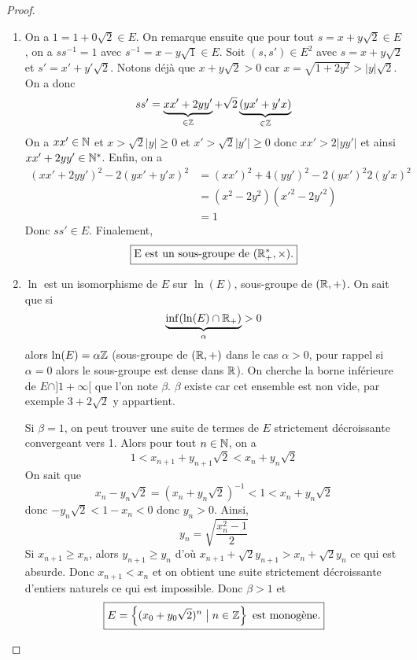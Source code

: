 \begin{proof}
	\phantom{}
	\begin{enumerate}
		\item On a $1=1+0\sqrt{2}\in E$. On remarque ensuite que pour tout $s=x+y\sqrt{2}\in E$, on a $ss^{-1}=1$ avec $s^{-1}=x-y\sqrt{1}\in E$. Soit $(s,s')\in E^{2}$ avec $s=x+y\sqrt{2}$ et $s'=x'+y'\sqrt{2}$. Notons déjà que $x+y\sqrt{2}>0$ car $x=\sqrt{1+2y^{2}}>\vert y\vert\sqrt{2}$.
		On a donc
		\begin{equation}
			ss'=\underbrace{xx'+2yy'}_{\in\mathbb{Z}}+\sqrt{2}\underbrace{(yx'+y'x)}_{\in\mathbb{Z}}
		\end{equation}
		On a $xx'\in\mathbb{N}$ et $x>\sqrt{2}\vert y\vert\geqslant0$ et $x'>\sqrt{2}\vert y'\vert\geqslant0$ donc $xx'>2\vert yy'\vert$ et ainsi $xx'+2yy'\in\mathbb{N}^{*}$. Enfin, on a 
		\begin{align}
			(xx'+2yy')^{2}-2(yx'+y'x)^{2}
			&=(xx')^{2}+4(yy')^{2}-2(yx')^{2}2(y'x)^{2}\\
			&=(x^{2}-2y^{2})(x'^{2}-2y'^{2})\\
			&=1
		\end{align}
		Donc $ss'\in E$. Finalement, 
		\begin{equation}
			\boxed{\text{E est un sous-groupe de }(\mathbb{R}_{+}^{*},\times).}
		\end{equation}

		\item $\ln$ est un isomorphisme de $E$ sur $\ln(E)$, sous-groupe de $(\mathbb{R},+)$. On sait que si 
		\begin{equation}
			\underbrace{\inf(\ln(E)\cap\mathbb{R}_{+})}_{\alpha}>0
		\end{equation}
		alors $\ln(E)=\alpha\mathbb{Z}$ (sous-groupe de $(\mathbb{R},+)$ dans le cas $\alpha>0$, pour rappel si $\alpha=0$ alors le sous-groupe est dense dans $\mathbb{R}$). On cherche la borne inférieure de $E\cap]1+\infty[$ que l'on note $\beta$. $\beta$ existe car cet ensemble est non vide, par exemple $3+2\sqrt{2}$ y appartient.
		
		Si $\beta=1$, on peut trouver une suite de termes de $E$ strictement décroissante convergeant vers 1. Alors pour tout $n\in\mathbb{N}$, on a 
		\begin{equation}
			1<x_{n+1}+y_{n+1}\sqrt{2}<x_{n}+y_{n}\sqrt{2}
		\end{equation}
		On sait que 
		\begin{equation}
			x_{n}-y_{n}\sqrt{2}=(x_{n}+y_{n}\sqrt{2})^{-1}<1<x_{n}+y_{n}\sqrt{2}
		\end{equation}
		donc $-y_{n}\sqrt{2}<1-x_{n}<0$ donc $y_{n}>0$. Ainsi, 
		\begin{equation}
			y_{n}=\sqrt{\frac{x_{n}^{2}-1}{2}}
		\end{equation}
		Si $x_{n+1}\geqslant x_{n}$, alors $y_{n+1}\geqslant y_{n}$ d'où $x_{n+1}+\sqrt{2}y_{n+1}>x_{n}+\sqrt{2}y_{n}$ ce qui est absurde. Donc $x_{n+1}<x_{n}$ et on obtient une suite strictement décroissante d'entiers naturels ce qui est impossible. Donc $\beta>1$ et 
		\begin{equation}
			\boxed{E=\left\{(x_{0}+y_{0}\sqrt{2})^{n}\bigm| n\in\mathbb{Z}\right\}\text{ est monogène.}}
		\end{equation}


\end{enumerate}
\end{proof}
